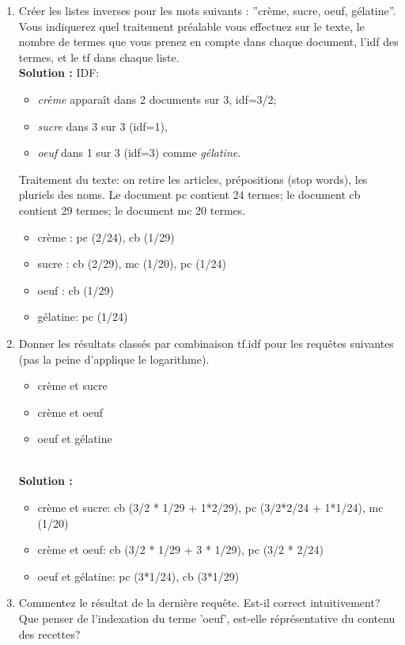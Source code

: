 \documentclass[9pt,a4paper]{article}
\newenvironment{solution}[0]{
~\\ \color{red} \textbf{Solution :}\color{black}}{%
}
\begin{document}
\begin{enumerate}
  \item Cr\'eer les listes inverses pour les mots suivants : ''crème, sucre, oeuf, gélatine''.\\
  Vous indiquerez quel traitement préalable vous effectuez
  sur le texte, le nombre de termes que vous prenez en compte dans chaque document, l'idf des
  termes, et le tf dans chaque liste. 
\begin{solution}
IDF: 
\begin{itemize}
  \item \emph{crème} apparaît dans 2 documents sur 3, idf=3/2; 
   \item \emph{sucre} dans 3 sur 3 (idf=1), 
   \item \emph{oeuf} dans
1 sur 3 (idf=3) comme \emph{gélatine}.
\end{itemize}
Traitement du texte: on retire les articles, prépositions (stop words), les pluriels des noms. 
Le document pc contient 24 termes; le document cb contient 29 termes; le document mc 20 termes.
\begin{itemize}
  \item crème : pc (2/24), cb (1/29)
  \item sucre : cb (2/29), mc (1/20), pc (1/24)
  \item oeuf : cb (1/29)
  \item gélatine: pc (1/24)
\end{itemize}
\end{solution}

  \item Donner les résultats classés par combinaison tf.idf pour les requêtes suivantes (pas la peine d'applique le logarithme).
  
  \begin{itemize}
    \item crème et sucre
    \item crème et oeuf
    \item oeuf et gélatine
  \end{itemize}
\begin{solution}
\begin{itemize}
  \item crème et sucre: cb (3/2 * 1/29 + 1*2/29), pc (3/2*2/24 + 1*1/24), mc (1/20)
  \item crème et oeuf: cb (3/2 * 1/29 + 3 * 1/29), pc (3/2 * 2/24) 
  \item oeuf et gélatine: pc (3*1/24), cb (3*1/29)
\end{itemize}
\end{solution}  
  \item Commentez le résultat de la dernière requête. Est-il correct intuitivement? Que penser de l'indexation
    du terme 'oeuf', est-elle réprésentative du contenu des recettes?
  \end{enumerate}
\end{document}
